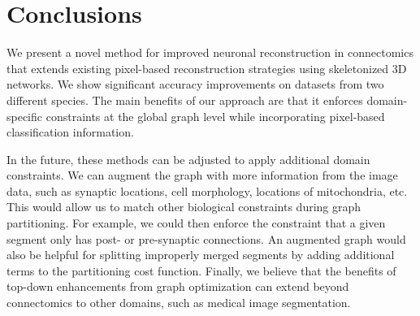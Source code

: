 \section{Conclusions}

We present a novel method for improved neuronal reconstruction in connectomics that extends existing pixel-based reconstruction strategies using skeletonized 3D networks. 
We show significant accuracy improvements on datasets from two different species. 
The main benefits of our approach are that it enforces domain-specific constraints at the global graph level while incorporating pixel-based classification information.

In the future, these methods can be adjusted to apply additional domain constraints. 
We can augment the graph with more information from the image data, such as synaptic locations, cell morphology, locations of mitochondria, etc. 
This would allow us to match other biological constraints during graph partitioning. 
For example, we could then enforce the constraint that a given segment only has post- or pre-synaptic connections. 
An augmented graph would also be helpful for splitting improperly merged segments by adding additional terms to the partitioning cost function. 
Finally, we believe that the benefits of top-down enhancements from graph optimization can extend beyond connectomics to other domains, such as medical image segmentation.
